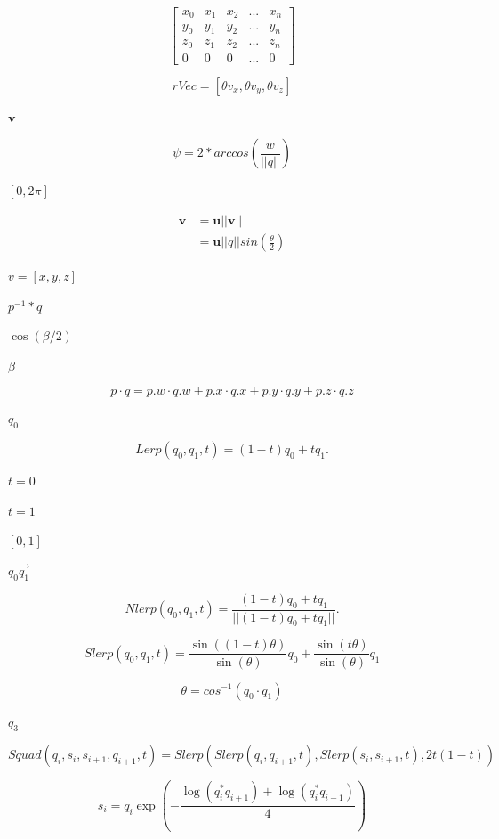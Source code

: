 \documentclass{article}
\begin{document}
\[\begin{bmatrix}
x_0& x_1& x_2&...&x_n\\
y_0& y_1& y_2&...&y_n\\
z_0& z_1& z_2&...&z_n\\
0&0&0&...&0
\end{bmatrix}\]
\pagebreak

\[ rVec = [\theta v_x, \theta v_y, \theta v_z]\]
\pagebreak

$\boldsymbol{v}$
\pagebreak

\[\psi = 2 *arccos(\frac{w}{||q||})\]
\pagebreak

$[0, 2\pi]$
\pagebreak

\[\begin{equation}
          \begin{split}
            \boldsymbol{v}
            &= \boldsymbol{u} ||\boldsymbol{v}||\\
            &= \boldsymbol{u}||q||sin(\frac{\theta}{2})
          \end{split}
          \end{equation}\]
\pagebreak

$v=[x, y ,z]$
\pagebreak

$p^{-1} * q$
\pagebreak

$\cos(\beta/2)$
\pagebreak

$\beta$
\pagebreak

\[p \cdot q = p.w \cdot q.w + p.x \cdot q.x + p.y \cdot q.y + p.z \cdot q.z\]
\pagebreak

$q_0$
\pagebreak

\[Lerp(q_0, q_1, t) = (1 - t)q_0 + tq_1.\]
\pagebreak

$t = 0$
\pagebreak

$t= 1$
\pagebreak

$[0, 1]$
\pagebreak

$\overrightarrow{q_0q_1}$
\pagebreak

\[ Nlerp(q_0, q_1, t) = \frac{(1 - t)q_0 + tq_1}{||(1 - t)q_0 + tq_1||}.\]
\pagebreak

\[ Slerp(q_0, q_1, t) = \frac{\sin((1-t)\theta)}{\sin(\theta)}q_0 + \frac{\sin(t\theta)}{\sin(\theta)}q_1\]
\pagebreak

\[\theta=cos^{-1}(q_0\cdot q_1)\]
\pagebreak

$q_3$
\pagebreak

\[Squad(q_i, s_i, s_{i+1}, q_{i+1}, t) = Slerp(Slerp(q_i, q_{i+1}, t), Slerp(s_i, s_{i+1}, t), 2t(1-t))\]
\pagebreak

\[s_i = q_i\exp(-\frac{\log(q^*_iq_{i+1}) + \log(q^*_iq_{i-1})}{4})\]
\pagebreak
\end{document}

